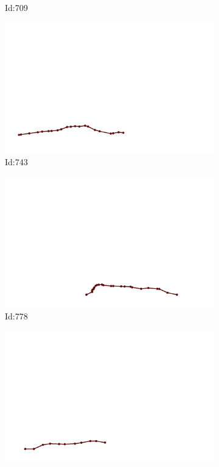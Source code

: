 \documentclass[12pt,twoside]{report}
\begin{document}
\begin{figure}
\begin{subfigure}[b]{0.20\textwidth}
\caption{Id:709}
\end{subfigure}
\begin{subfigure}[b]{0.20\textwidth}
\centering
\includegraphics[width=\textwidth]{../trajectories/743.png}
\caption{Id:743}
\end{subfigure}
\begin{subfigure}[b]{0.20\textwidth}
\centering
\includegraphics[width=\textwidth]{../trajectories/778.png}
\caption{Id:778}
\end{subfigure}
\begin{subfigure}[b]{0.20\textwidth}
\centering
\includegraphics[width=\textwidth]{../trajectories/785.png}

\end{subfigure}
\end{figure}
\end{document}
